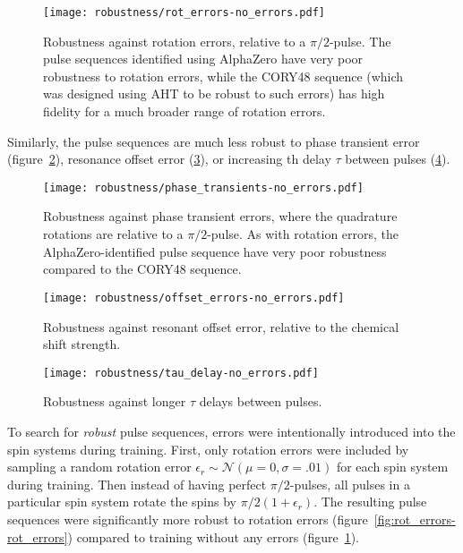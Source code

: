 

\begin{figure}[H]
    \centering
    \texttt{[image: robustness/rot\_errors-no\_errors.pdf]}
    \caption{Robustness against rotation errors, relative to a $\pi/2$-pulse. The pulse sequences identified using AlphaZero have very poor robustness to rotation errors, while the CORY48 sequence (which was designed using AHT to be robust to such errors) has high fidelity for a much broader range of rotation errors.
    }
    \label{fig:rot_errors-no_errors}
\end{figure}

Similarly, the pulse sequences are much less robust to phase transient error (figure~\ref{fig:phase_transients-no_errors}),
resonance offset error (\ref{fig:offset_errors-no_errors}),
or increasing th delay $\tau$ between pulses (\ref{fig:tau_delay-no_errors}).


\begin{figure}[H]
    \centering
    \texttt{[image: robustness/phase\_transients-no\_errors.pdf]}
    \caption{Robustness against phase transient errors, where the quadrature rotations are relative to a $\pi/2$-pulse. As with rotation errors, the AlphaZero-identified pulse sequence have very poor robustness compared to the CORY48 sequence.
    }
    \label{fig:phase_transients-no_errors}
\end{figure}


\begin{figure}[H]
    \centering
    \texttt{[image: robustness/offset\_errors-no\_errors.pdf]}
    \caption{Robustness against resonant offset error, relative to the chemical shift strength.
    }
    \label{fig:offset_errors-no_errors}
\end{figure}

\begin{figure}[H]
    \centering
    \texttt{[image: robustness/tau\_delay-no\_errors.pdf]}
    \caption{Robustness against longer $\tau$ delays between pulses.
    }
    \label{fig:tau_delay-no_errors}
\end{figure}


To search for \emph{robust} pulse sequences, errors were intentionally introduced into the spin systems during training. First, only rotation errors were included by sampling a random rotation error $\epsilon_r \sim \mathcal{N}(\mu=0, \sigma=.01)$ for each spin system during training. Then instead of having perfect $\pi/2$-pulses, all pulses in a particular spin system rotate the spins by $\pi/2(1+\epsilon_r)$. The resulting pulse sequences were significantly more robust to rotation errors (figure~\ref{fig:rot_errors-rot_errors})
compared to training without any errors (figure~\ref{fig:rot_errors-no_errors}).

